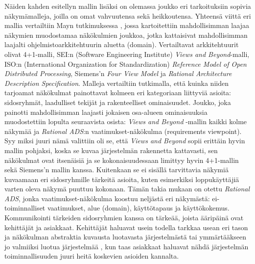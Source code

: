 \documentclass[finnish]{tktltiki2}
\theoremstyle{definition}
\theoremstyle{remark}
\begin{document}
Näiden kahden esitellyn mallin lisäksi on olemassa joukko eri tarkoituksiin sopivia näkymämalleja, joilla on omat vahvuutensa sekä heikkoutensa. Yhteensä viittä eri mallia vertailtiin Mayn tutkimuksessa \cite{may2005survey}, jossa kartoitettiin mahdollisimman laajaa näkymien muodostamaa näkökulmien joukkoa, jotka kattaisivat mahdollisimman laajalti ohjelmistoarkkitehtuurin aluetta (domain). Vertailtavat arkkitehtuurit olivat 4+1-malli, SEI:n (Software Engineering Institute) \textit{Views and Beyond}-malli, ISO:n (International Organization for Standardization) \textit{Reference Model of Open Distributed Processing}, Siemens'n \textit{Four View Model} ja \textit{Rational Architecture Description Specification}. Malleja vertailtiin tutkimalla, että kuinka niiden tarjoamat näkökulmat painottavat kolmeen eri kategoriaan liittyviä asioita: sidosryhmät, laadulliset tekijät ja rakenteelliset ominaisuudet. Joukko, joka painotti mahdollisimman laajasti jokaisen osa-alueen ominaisuuksia muodostettiin lopulta seuraavista osista: \textit{Views and Beyond} -mallin kaikki kolme näkymää ja \textit{Rational ADS}:n vaatimukset-näkökulma (requirements viewpoint). Syy miksi juuri nämä valittiin oli se, että \textit{Views and Beyond} sopii erittäin hyvin mallin pohjaksi, koska se kuvaa järjestelmän rakennetta kattavasti, sen näkökulmat ovat itsenäisiä ja se kokonaisuudessaan limittyy hyvin 4+1-mallin sekä Siemens'n mallin kanssa. Kuitenkaan se ei sisällä tarvittavia näkymiä kuvaamaan eri sidosryhmille tärkeitä asioita, kuten esimerkiksi loppukäyttäjiä varten oleva näkymä puuttuu kokonaan. Tämän takia mukaan on otettu \textit{Rational ADS}, jonka vaatimukset-näkökulma koostuu neljästä eri näkymästä: ei-toiminnalliset vaatimukset, alue (domain), käyttötapaus ja käyttökokemus. Kommunikointi tärkeiden sidosryhmien kanssa on tärkeää, joista ääripäinä ovat kehittäjät ja asiakkaat. Kehittäjät haluavat usein todella tarkkaa usean eri tason ja näkökulman abstraktia kuvausta luotavasta järjestelmästä \citep[s. 120]{Ran:1998:ASV:288408.288438} tai ymmärtääkseen jo valmiiksi luotua järjestelmää \cite{ARaHVeSCiSDu}, kun taas asiakkaat haluavat nähdä järjestelmän toiminnallisuuden juuri heitä koskevien asioiden kannalta.
\end{document}
